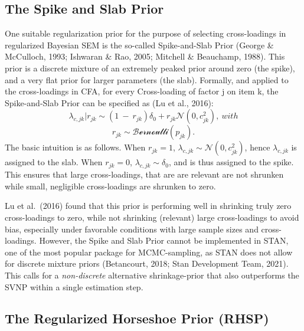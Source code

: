 \documentclass[
  english,
  man, donotrepeattitle,floatsintext]{apa6}
\begin{document}
\hypertarget{the-spike-and-slab-prior}{%
\subsection{The Spike and Slab Prior}\label{the-spike-and-slab-prior}}

One suitable regularization prior for the purpose of selecting cross-loadings in
regularized Bayesian SEM is the so-called Spike-and-Slab Prior (George \& McCulloch, 1993; Ishwaran \& Rao, 2005; Mitchell \& Beauchamp, 1988). This prior is a discrete mixture of an extremely peaked prior around zero (the spike), and a very flat prior for larger parameters (the slab). Formally, and applied to the cross-loadings in CFA, for every Cross-loading of factor j
on item k, the Spike-and-Slab Prior can be specified as (Lu et al., 2016):
\[\lambda_{c,jk} |r_{jk} \sim (1 \ - \ r_{jk})\delta_0 + r_{jk} \mathcal{N}(0, c^2_{jk}) , \ with\]
\[r_{jk} \sim \mathcal{Bernoulli}(p_{jk}).\]
The basic intuition is as follows. When \(r_{jk} = 1\), \(\lambda_{c,jk} \sim \mathcal{N}(0, c^2_{jk})\), hence \(\lambda_{c,jk}\) is assigned to the slab. When \(r_{jk} = 0\), \(\lambda_{c,jk} \sim \delta_0\), and is thus assigned to the spike. This ensures that large cross-loadings, that are are relevant are not shrunken while small, negligible cross-loadings are shrunken to zero.

Lu et al.~(2016) found that this prior is performing well in shrinking truly zero cross-loadings to zero, while not shrinking (relevant) large cross-loadings to avoid bias, especially under favorable conditions with large sample sizes and cross-loadings. However, the Spike and Slab Prior cannot be implemented in STAN, one of the most popular package for MCMC-sampling, as STAN does not allow for discrete mixture priors (Betancourt, 2018; Stan Development Team, 2021). This calls for a \emph{non-discrete} alternative shrinkage-prior that also outperforms the SVNP within a single estimation step.

\hypertarget{the-regularized-horseshoe-prior-rhsp}{%
\subsection{The Regularized Horseshoe Prior (RHSP)}\label{the-regularized-horseshoe-prior-rhsp}}
\end{document}
